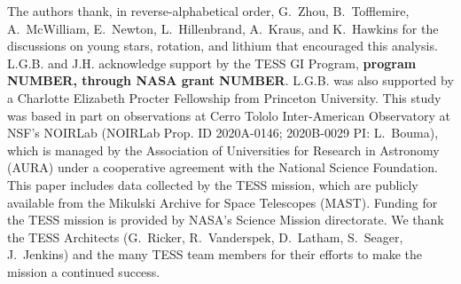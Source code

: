 \documentclass[12pt,twocolumn,tighten]{aastex63}
\begin{document}


\acknowledgements
\raggedbottom

The authors thank, in reverse-alphabetical order, G.~Zhou,
B.~Tofflemire, A.~McWilliam, E.~Newton, L.~Hillenbrand, A.~Kraus, and
K.~Hawkins for the discussions on young stars, rotation, and lithium
that encouraged this analysis.
%
L.G.B. and J.H. acknowledge support by the TESS GI Program, {\bf program
NUMBER, through NASA grant NUMBER}.
L.G.B. was also supported by a Charlotte Elizabeth Procter Fellowship
from Princeton University.
%
This study was based in part on observations at Cerro Tololo
Inter-American Observatory at NSF's NOIRLab (NOIRLab Prop. ID
2020A-0146; 2020B-0029 PI: L{.}~Bouma), which is managed by the
Association of Universities for Research in Astronomy (AURA) under a
cooperative agreement with the National Science Foundation.
%
%
This paper includes data collected by the TESS mission, which are
publicly available from the Mikulski Archive for Space Telescopes
(MAST).
%
Funding for the TESS mission is provided by NASA's Science Mission
directorate.
%
We thank the TESS Architects (G.~Ricker, R.~Vanderspek, D.~Latham,
S.~Seager, J.~Jenkins) and the many TESS team members for their
efforts to make the mission a continued success.
%

%
%


%
\end{document}
